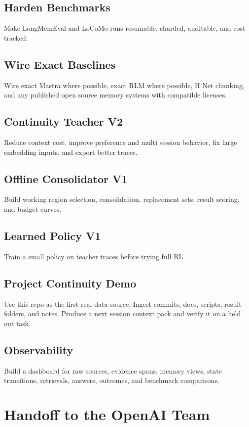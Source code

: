 \documentclass[11pt]{article}
\begin{document}
\subsection{Harden Benchmarks}
Make LongMemEval and LoCoMo runs resumable, sharded, auditable, and cost tracked.

\subsection{Wire Exact Baselines}
Wire exact Mastra where possible, exact RLM where possible, H Net chunking, and any published open source memory systems with compatible licenses.

\subsection{Continuity Teacher V2}
Reduce context cost, improve preference and multi session behavior, fix large embedding inputs, and export better traces.

\subsection{Offline Consolidator V1}
Build working region selection, consolidation, replacement sets, result scoring, and budget curves.

\subsection{Learned Policy V1}
Train a small policy on teacher traces before trying full RL.

\subsection{Project Continuity Demo}
Use this repo as the first real data source. Ingest commits, docs, scripts, result folders, and notes. Produce a next session context pack and verify it on a held out task.

\subsection{Observability}
Build a dashboard for raw sources, evidence spans, memory views, state transitions, retrievals, answers, outcomes, and benchmark comparisons.

\section{Handoff to the OpenAI Team}
\end{document}
